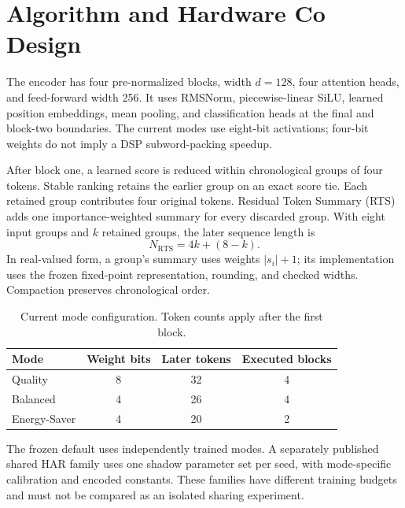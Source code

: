 \section{Algorithm and Hardware Co Design}
\label{sec:codesign}
The encoder has four pre-normalized blocks, width $d=128$, four attention heads,
and feed-forward width 256. It uses RMSNorm, piecewise-linear SiLU, learned
position embeddings, mean pooling, and classification heads at the final and
block-two boundaries. The current modes use eight-bit activations; four-bit
weights do not imply a DSP subword-packing speedup.

After block one, a learned score is reduced within chronological groups of four
tokens. Stable ranking retains the earlier group on an exact score tie. Each
retained group contributes four original tokens. Residual Token Summary (RTS)
adds one importance-weighted summary for every discarded group. With eight
input groups and $k$ retained groups, the later sequence length is
\begin{equation}
  N_{\mathrm{RTS}}=4k+(8-k).
\end{equation}
In real-valued form, a group's summary uses weights $|s_i|+1$; its implementation
uses the frozen fixed-point representation, rounding, and checked widths.
Compaction preserves chronological order.

\begin{table}
\caption{Current mode configuration. Token counts apply after the first block.}
\label{tab:modes}
\centering
\begin{tabular}{lccc}
\toprule
Mode & Weight bits & Later tokens & Executed blocks \\
\midrule
Quality & 8 & 32 & 4 \\
Balanced & 4 & 26 & 4 \\
Energy-Saver & 4 & 20 & 2 \\
\bottomrule
\end{tabular}
\end{table}

The frozen default uses independently trained modes. A separately published
shared HAR family uses one shadow parameter set per seed, with mode-specific
calibration and encoded constants. These families have different training
budgets and must not be compared as an isolated sharing experiment.
